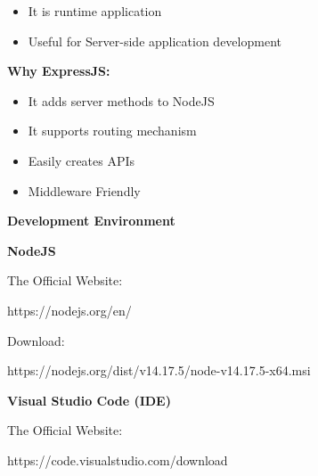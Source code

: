 \documentclass[
]{article}
\providecommand{\tightlist}{%
  \setlength{\itemsep}{0pt}\setlength{\parskip}{0pt}}
\begin{document}
\begin{itemize}
\tightlist
\item
  It is runtime application
\item
  Useful for Server-side application development
\end{itemize}

\hfill    

{\textbf{Why ExpressJS}}\textbf{:}

\begin{itemize}
\tightlist
\item
  It adds server methods to NodeJS
\item
  It supports routing mechanism
\item
  Easily creates APIs
\item
  Middleware Friendly
\end{itemize}

\hfill    
 
\newpage
{\textbf{Development Environment}}



{\textbf{NodeJS}}

The Official Website:{~}

https://nodejs.org/en/



Download:{~}

https://nodejs.org/dist/v14.17.5/node-v14.17.5-x64.msi

\hfill    


{\textbf{Visual Studio Code (IDE)}}

The Official Website:{~}

https://code.visualstudio.com/download
\end{document}
